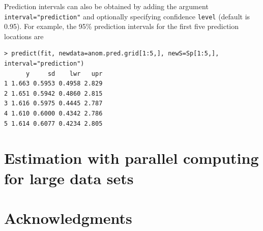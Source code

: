 \documentclass[11pt]{article}
\begin{document}
Prediction intervals can also be obtained by adding the argument {\tt interval="prediction"} and optionally specifying confidence {\tt level} (default is 0.95).
For example, the 95\% prediction intervals for the first five prediction locations are

\begin{verbatim}
> predict(fit, newdata=anom.pred.grid[1:5,], newS=Sp[1:5,], interval="prediction")
      y     sd    lwr   upr
1 1.663 0.5953 0.4958 2.829
2 1.651 0.5942 0.4860 2.815
3 1.616 0.5975 0.4445 2.787
4 1.610 0.6000 0.4342 2.786
5 1.614 0.6077 0.4234 2.805
\end{verbatim}

\section{Estimation with parallel computing for large data sets}\label{s:parallel}

\section*{Acknowledgments}

\begin{singlespace}
	
	
\end{singlespace}
\end{document}
